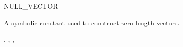 \begin{ccRefConstant}{NULL_VECTOR}


\ccDefinition
A symbolic constant used to construct zero length vectors.

\ccSeeAlso
{}, , , 

\end{ccRefConstant}
